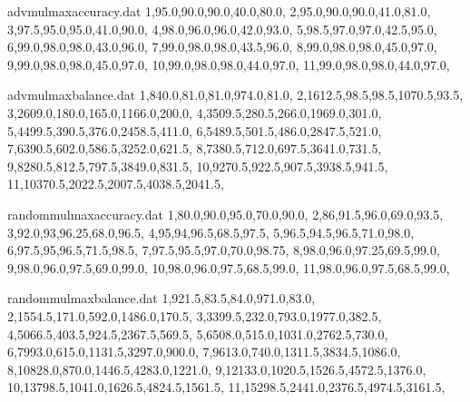 \documentclass{aamas2014}
\begin{document}
\begin{filecontents}{advmulmaxaccuracy.dat}
1,95.0,90.0,90.0,40.0,80.0,
2,95.0,90.0,90.0,41.0,81.0,
3,97.5,95.0,95.0,41.0,90.0,
4,98.0,96.0,96.0,42.0,93.0,
5,98.5,97.0,97.0,42.5,95.0,
6,99.0,98.0,98.0,43.0,96.0,
7,99.0,98.0,98.0,43.5,96.0,
8,99.0,98.0,98.0,45.0,97.0,
9,99.0,98.0,98.0,45.0,97.0,
10,99.0,98.0,98.0,44.0,97.0,
11,99.0,98.0,98.0,44.0,97.0,
\end{filecontents}
\begin{filecontents}{advmulmaxbalance.dat}
1,840.0,81.0,81.0,974.0,81.0,
2,1612.5,98.5,98.5,1070.5,93.5,
3,2609.0,180.0,165.0,1166.0,200.0,
4,3509.5,280.5,266.0,1969.0,301.0,
5,4499.5,390.5,376.0,2458.5,411.0,
6,5489.5,501.5,486.0,2847.5,521.0,
7,6390.5,602.0,586.5,3252.0,621.5,
8,7380.5,712.0,697.5,3641.0,731.5,
9,8280.5,812.5,797.5,3849.0,831.5,
10,9270.5,922.5,907.5,3938.5,941.5,
11,10370.5,2022.5,2007.5,4038.5,2041.5,
\end{filecontents}
\begin{filecontents}{randommulmaxaccuracy.dat}
1,80.0,90.0,95.0,70.0,90.0,
2,86,91.5,96.0,69.0,93.5,
3,92.0,93,96.25,68.0,96.5,
4,95,94,96.5,68.5,97.5,
5,96.5,94.5,96.5,71.0,98.0,
6,97.5,95,96.5,71.5,98.5,
7,97.5,95.5,97.0,70.0,98.75,
8,98.0,96.0,97.25,69.5,99.0,
9,98.0,96.0,97.5,69.0,99.0,
10,98.0,96.0,97.5,68.5,99.0,
11,98.0,96.0,97.5,68.5,99.0,
\end{filecontents}
\begin{filecontents}{randommulmaxbalance.dat}
1,921.5,83.5,84.0,971.0,83.0,
2,1554.5,171.0,592.0,1486.0,170.5,
3,3399.5,232.0,793.0,1977.0,382.5,
4,5066.5,403.5,924.5,2367.5,569.5,
5,6508.0,515.0,1031.0,2762.5,730.0,
6,7993.0,615.0,1131.5,3297.0,900.0,
7,9613.0,740.0,1311.5,3834.5,1086.0,
8,10828.0,870.0,1446.5,4283.0,1221.0,
9,12133.0,1020.5,1526.5,4572.5,1376.0,
10,13798.5,1041.0,1626.5,4824.5,1561.5,
11,15298.5,2441.0,2376.5,4974.5,3161.5,
\end{filecontents}
\hspace{-4mm}
\end{document}
